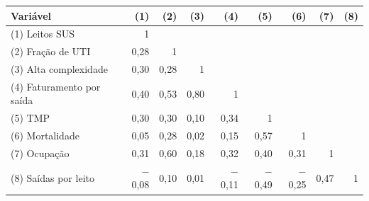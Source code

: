 \begin{tabular}{lrrrrrrrr}
\toprule
Variável & (1) & (2) & (3) & (4) & (5) & (6) & (7) & (8) \\
\midrule
(1) Leitos SUS & 1 &  &  &  &  &  &  &  \\
(2) Fração de UTI & 0,28 & 1 &  &  &  &  &  &  \\
(3) Alta complexidade & 0,30 & 0,28 & 1 &  &  &  &  &  \\
(4) Faturamento por saída & 0,40 & 0,53 & 0,80 & 1 &  &  &  &  \\
(5) TMP & 0,30 & 0,30 & 0,10 & 0,34 & 1 &  &  &  \\
(6) Mortalidade & 0,05 & 0,28 & 0,02 & 0,15 & 0,57 & 1 &  &  \\
(7) Ocupação & 0,31 & 0,60 & 0,18 & 0,32 & 0,40 & 0,31 & 1 &  \\
(8) Saídas por leito & \ensuremath{-}0,08 & 0,10 & 0,01 & \ensuremath{-}0,11 & \ensuremath{-}0,49 & \ensuremath{-}0,25 & 0,47 & 1 \\
\bottomrule
\end{tabular}
